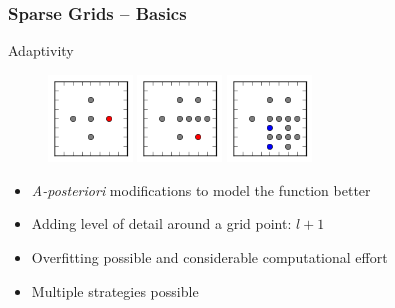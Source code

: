 \begin{frame}
  \frametitle{Sparse Grids -- Basics}
  \topline
  \vspace{-10px}
  \begin{block}{Adaptivity}
    \begin{figure}[!htp]
      \centering
      \includegraphics[width=0.2\textwidth]{images/adaptive_0}
      \includegraphics[width=0.2\textwidth]{images/adaptive_1}
      \includegraphics[width=0.2\textwidth]{images/adaptive_2}
      \caption{}
    \end{figure}
    \vspace{-20px}
    \begin{itemize}
      \item \emph{A-posteriori} modifications to model the function better
      \item Adding level of detail around a grid point: $l + 1$
      \item Overfitting possible and considerable computational effort
      \item Multiple strategies possible
      \end{itemize}
  \end{block}
\end{frame}

